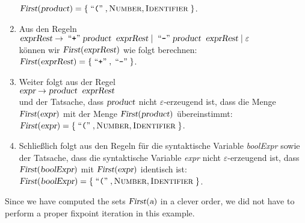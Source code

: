 \begin{enumerate}
      $\textsl{First}(\textsl{product}) = \{ \;\mbox{``\texttt{(}''}\;, \textsc{Number}, \textsc{Identifier}\; \}$.
\item Aus den Regeln
      \\[0.2cm]
      \hspace*{1.3cm}
      $\textsl{exprRest} \rightarrow \;\mbox{``\texttt{+}''}\; \textsl{product}\;\;\textsl{exprRest} 
                         \mid        \;\mbox{``\texttt{-}''}\; \textsl{product}\;\;\textsl{exprRest} 
                         \mid        \varepsilon$
      \\[0.2cm]
      k\"onnen wir $\textsl{First}(\textsl{exprRest})$ wie folgt berechnen:
      \\[0.2cm]
      \hspace*{1.3cm}
      $\textsl{First}(\textsl{exprRest}) = \{ \;\mbox{``\texttt{+}''}\;, \;\mbox{``\texttt{-}''}\; \}$.
\item Weiter folgt aus der Regel
      \\[0.2cm]
      \hspace*{1.3cm}
      $\textsl{expr} \rightarrow \textsl{product}\;\;\textsl{exprRest}$
      \\[0.2cm]
      und der Tatsache, dass $\textsl{product}$ nicht $\varepsilon$-erzeugend ist,
      dass die Menge $\textsl{First}(\textsl{expr})$ mit der Menge
      $\textsl{First}(\textsl{product})$ \"ubereinstimmt:
      \\[0.2cm]
      \hspace*{1.3cm}
      $\textsl{First}(\textsl{expr}) = \{ \;\mbox{``\texttt{(}''}\;, \textsc{Number}, \textsc{Identifier}\; \}$.
\item Schlie{\ss}lich folgt aus den Regeln f\"ur die syntaktische Variable \textsl{boolExpr}
      sowie der Tatsache, dass die syntaktische Variable \textsl{expr} nicht $\varepsilon$-erzeugend ist,
      dass $\textsl{First}(\textsl{boolExpr})$ mit $\textsl{First}(\textsl{expr})$ identisch ist:
      \\[0.2cm]
      \hspace*{1.3cm}
      $\textsl{First}(\textsl{boolExpr}) = \{ \;\mbox{``\texttt{(}''}\;, \textsc{Number}, \textsc{Identifier}\; \}$.
\end{enumerate}
Since we have computed the sets $\textsl{First}(\textsl{a})$ in a clever order, we did not have to perform a
proper fixpoint iteration in this example.
\eox


